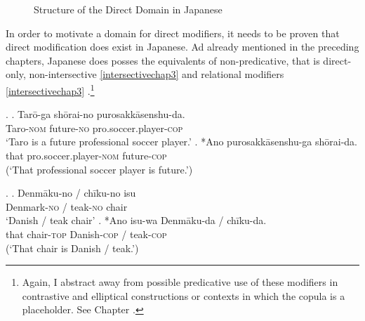 \documentclass [output=book,colorlinks,citecolor=brown]{langscibook}
\begin{document}
\begin{figure}[H]
\centering


 \caption{Structure of the Direct Domain in Japanese}
 \label{fig:Structure of the Direct Domain in Japanese1}
\end{figure}

\newpage


In order to motivate a domain for direct modifiers, it needs to be proven that direct modification does exist in Japanese. Ad already mentioned in the preceding chapters, Japanese does posses the equivalents of non-predicative, that is direct-only, non-intersective \ref{intersectivechap3} and relational modifiers \ref{intersectivechap3} \citep{yamakido:2005:nature, ayano:2010:revisiting, nagano:2016:are, watanabe:2017:attributive}.\footnote{Again, I abstract away from possible predicative use of these modifiers in contrastive and elliptical constructions or contexts in which the copula is a placeholder. See Chapter .} %

\ex. \label{intersectivechap3} \ag. Tarō-ga shōrai-no purosakkāsenshu-da.\\
Taro-\textsc{nom} future-\textsc{no} pro.soccer.player-\textsc{cop}\\
`Taro is a future professional soccer player.’
\bg. *Ano purosakkāsenshu-ga shōrai-da.\\
that pro.soccer.player-\textsc{nom} future-\textsc{cop}\\
(`That professional soccer player is future.’)

\ex. \label{relationalchap3} \ag. Denmāku-no / chīku-no isu\\
Denmark-\textsc{no} / teak-\textsc{no} chair\\
`Danish / teak chair'
\bg. *Ano isu-wa Denmāku-da / chīku-da.\\
that chair-\textsc{top} Danish-\textsc{cop} / teak-\textsc{cop}\\
(`That chair is Danish / teak.’)
\end{document}
